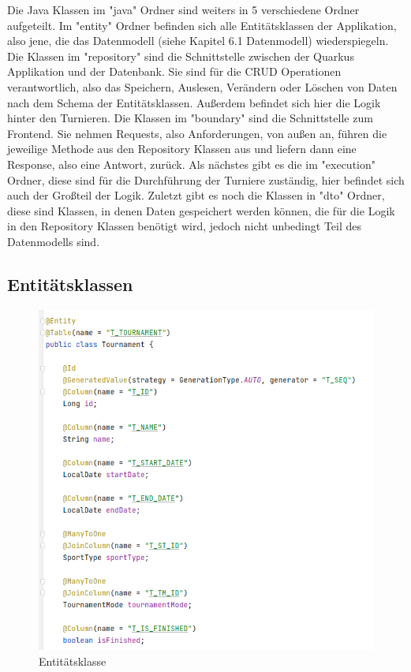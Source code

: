 Die Java Klassen im "java" Ordner sind weiters in 5 verschiedene Ordner aufgeteilt. Im "entity" Ordner befinden sich alle Entitätsklassen der Applikation, also jene, die das Datenmodell (siehe Kapitel 6.1 Datenmodell) wiederspiegeln.
Die Klassen im "repository" sind die Schnittstelle zwischen der Quarkus Applikation und der Datenbank. Sie sind für die CRUD Operationen verantwortlich, also das Speichern, Auslesen, Verändern oder Löschen von Daten nach dem Schema der Entitätsklassen.
Außerdem befindet sich hier die Logik hinter den Turnieren. Die Klassen im "boundary" sind die Schnittstelle zum Frontend. Sie nehmen Requests, also Anforderungen, von außen an, 
führen die jeweilige Methode aus den Repository Klassen aus und liefern dann eine Response, also eine Antwort, zurück. Als nächstes gibt es die im "execution" Ordner, diese sind für die Durchführung der Turniere zuständig, hier befindet sich auch der Großteil der Logik. 
Zuletzt gibt es noch die Klassen in "dto" Ordner, diese sind Klassen, in denen Daten gespeichert werden können, die für die Logik in den Repository Klassen benötigt wird, jedoch nicht unbedingt Teil des Datenmodells sind.

\subsection{Entitätsklassen}

\begin{figure}[H]
    \includegraphics[scale=0.8]{pics/entity_class.png}
    \caption{Entitätsklasse}
\end{figure}

